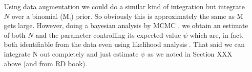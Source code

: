 Using data augmentation we could do a similar kind of integration but 
integrate $N$ over a binomial (M,\psi) prior. So obviously this is
approximately the same as M gets large. However, doing a bayesian
analysis by MCMC ,  we obtain an
estimate of both $N$ and the parameter controlling its expected value
$\psi$ which are, in fact, both identifiable from the data even using
likelihood analysis \citep{royle_etal:2007}.   That said we can integrate N
out completely and just estimate $\psi$ as we noted in Section XXX
above (and from RD book). 



